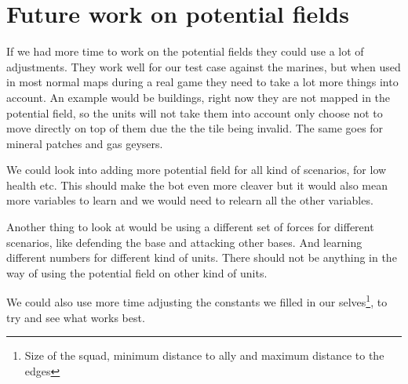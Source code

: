 \section{Future work on potential fields}
	If we had more time to work on the potential fields they could use a lot of adjustments. They work well for our test case against the marines, but when used in most normal maps during a real game they need to take a lot more things into account. An example would be buildings, right now they are not mapped in the potential field, so the units will not take them into account only choose not to move directly on top of them due the the tile being invalid. The same goes for mineral patches and gas geysers. 
	
	We could look into adding more potential field for all kind of scenarios, for low health etc. This should make the bot even more cleaver but it would also mean more variables to learn and we would need to relearn all the other variables.
	
	Another thing to look at would be using a different set of forces for different scenarios, like defending the base and attacking other bases. And learning different numbers for different kind of units. There should not be anything in the way of using the potential field on other kind of units.
	
	We could also use more time adjusting the constants we filled in our selves\footnote{Size of the squad, minimum distance to ally and maximum distance to the edges}, to try and see what works best.
	
	